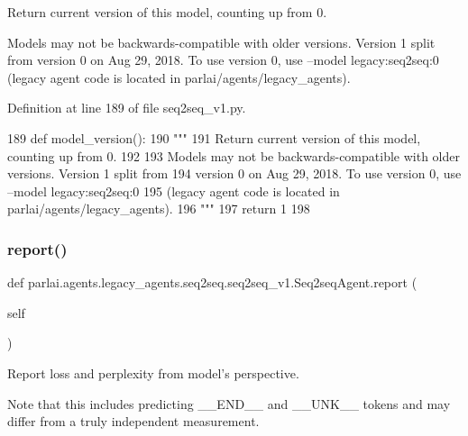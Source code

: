 \begin{DoxyVerb}Return current version of this model, counting up from 0.

Models may not be backwards-compatible with older versions. Version 1 split from
version 0 on Aug 29, 2018. To use version 0, use --model legacy:seq2seq:0
(legacy agent code is located in parlai/agents/legacy_agents).
\end{DoxyVerb}
 

Definition at line 189 of file seq2seq\+\_\+v1.\+py.


\begin{DoxyCode}
189     \textcolor{keyword}{def }model\_version():
190         \textcolor{stringliteral}{"""}
191 \textcolor{stringliteral}{        Return current version of this model, counting up from 0.}
192 \textcolor{stringliteral}{}
193 \textcolor{stringliteral}{        Models may not be backwards-compatible with older versions. Version 1 split from}
194 \textcolor{stringliteral}{        version 0 on Aug 29, 2018. To use version 0, use --model legacy:seq2seq:0}
195 \textcolor{stringliteral}{        (legacy agent code is located in parlai/agents/legacy\_agents).}
196 \textcolor{stringliteral}{        """}
197         \textcolor{keywordflow}{return} 1
198 
\end{DoxyCode}
\mbox{\label{classparlai_1_1agents_1_1legacy__agents_1_1seq2seq_1_1seq2seq__v1_1_1Seq2seqAgent_ae588ce85bae56791bac9dd744e5414ce}} 
\subsubsection{\texorpdfstring{report()}{report()}}
{\footnotesize\ttfamily def parlai.\+agents.\+legacy\+\_\+agents.\+seq2seq.\+seq2seq\+\_\+v1.\+Seq2seq\+Agent.\+report (\begin{DoxyParamCaption}\item[{}]{self }\end{DoxyParamCaption})}

\begin{DoxyVerb}Report loss and perplexity from model's perspective.

Note that this includes predicting __END__ and __UNK__ tokens and may differ
from a truly independent measurement.
\end{DoxyVerb}
 

